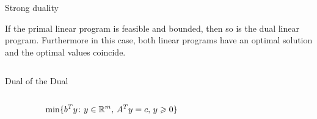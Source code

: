 \begin{frame}{Strong duality}

\begin{theorem}
  \label{thr:4}
  If the primal linear program is feasible and bounded, then so is 
  the dual linear program. Furthermore in this case, both linear
  programs have an optimal solution  and the optimal  values coincide. 
\end{theorem}

  \begin{columns}
    \begin{column}{.5\textwidth}
      
    \end{column}
    \begin{column}{.5\textwidth}
      
    \end{column}       
  \end{columns}
\end{frame}





\begin{frame}{}

  \begin{columns}
    \begin{column}{.5\textwidth}
      
    \end{column}
    \begin{column}{.5\textwidth}
      
    \end{column}       
  \end{columns}
\end{frame}





\begin{frame}{Dual of the Dual}

  \begin{columns}
    \begin{column}{.5\textwidth}
      \begin{displaymath}
   \min\{ b^Ty \colon y \in \mathbb{R}^m, \, A^T y = c, \, y\geqslant0\}
 \end{displaymath}
    \end{column}
    \begin{column}{.5\textwidth}
      
    \end{column}       
  \end{columns}
\end{frame}





